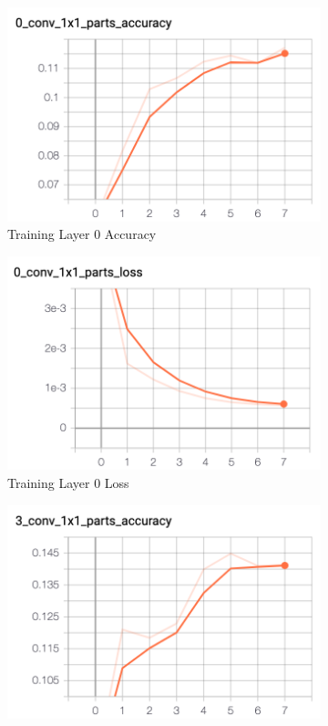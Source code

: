 \documentclass[11pt, letterpaper]{article}
\begin{document}
\begin{figure}[h]
    \centering
    \begin{subfigure}{0.4\textwidth}
        \includegraphics[width=0.8\linewidth]{train_layer_0_acc.png}
        \caption{Training Layer 0 Accuracy}
    \end{subfigure}
    \begin{subfigure}{0.4\textwidth}
        \includegraphics[width=0.8\linewidth]{train_layer_0_loss.png}
        \caption{Training Layer 0 Loss}
    \end{subfigure}
    \begin{subfigure}{0.4\textwidth}
        \includegraphics[width=0.8\linewidth]{train_layer_3_acc.png}

\end{subfigure}
\end{figure}
\end{document}
